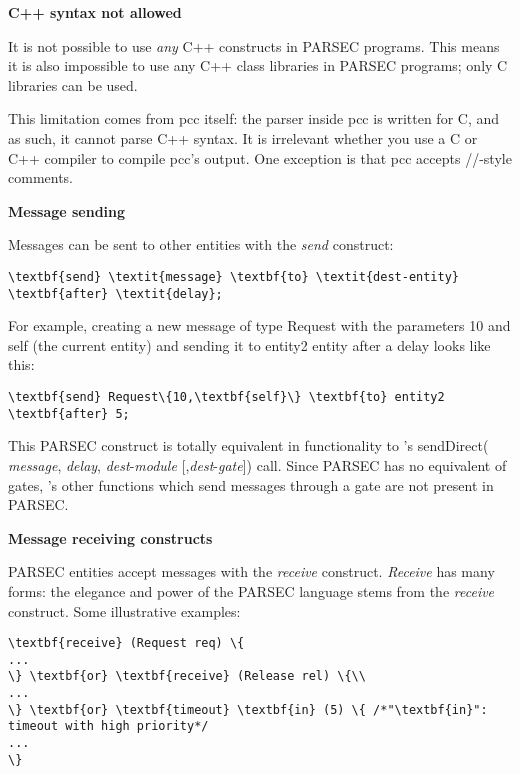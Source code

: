\textbf{C++ syntax not allowed}


It is not possible to use \textit{any} C++ constructs in PARSEC programs.
This means it is also impossible to use any C++ class libraries
in PARSEC programs; only C libraries can be used.

This limitation comes from pcc itself: the parser inside pcc
is written for C, and as such, it cannot parse C++ syntax. It
is irrelevant whether you use a C or C++ compiler to compile
pcc's output. One exception is that pcc accepts //-style comments.


\textbf{Message sending}


Messages can be sent to other entities with the \textit{send} construct:

\begin{Verbatim}[commandchars=\\\{\}]
\textbf{send} \textit{message} \textbf{to} \textit{dest-entity} \textbf{after} \textit{delay};
\end{Verbatim}

For example, creating a new message of type Request with the
parameters 10 and self (the current entity) and sending it to entity2
entity after a delay looks like this:

\begin{Verbatim}[commandchars=\\\{\}]
\textbf{send} Request\{10,\textbf{self}\} \textbf{to} entity2 \textbf{after} 5;
\end{Verbatim}

This PARSEC construct is totally equivalent in functionality
to {\opp}'s sendDirect( \textit{message}, \textit{delay}, \textit{dest}-\textit{module} [,\textit{dest}-\textit{gate}])
call. Since PARSEC has no equivalent of {\opp} gates, {\opp}'s
other  functions which send messages through a gate are
not present in PARSEC.


\textbf{Message receiving constructs }


PARSEC entities accept messages with the \textit{receive} construct. \textit{Receive}
has many forms: the elegance and power of the PARSEC language
stems from the \textit{receive} construct. Some illustrative examples:

\begin{Verbatim}[commandchars=\\\{\}]
\textbf{receive} (Request req) \{
...
\} \textbf{or} \textbf{receive} (Release rel) \{\\
...
\} \textbf{or} \textbf{timeout} \textbf{in} (5) \{ /*"\textbf{in}": timeout with high priority*/
...
\}
\end{Verbatim}


